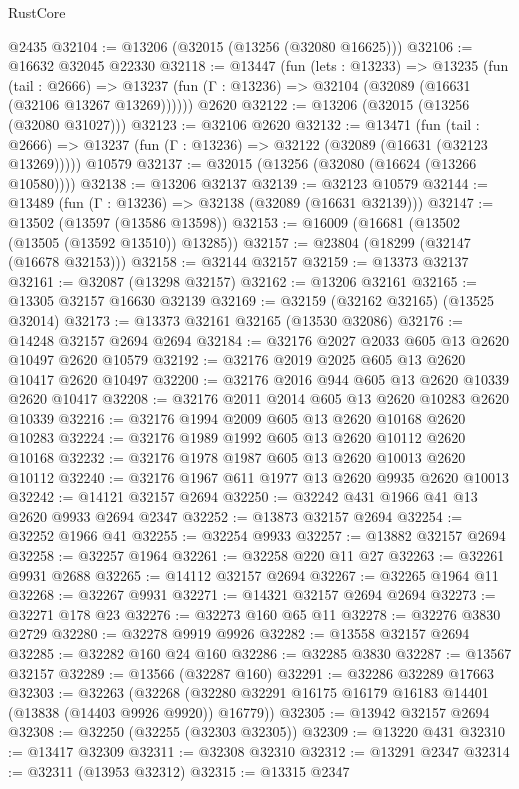 \begin{lexlean}{RustCore}
\begin{coremodule}
    @2435
@32104 := @13206 (@32015 (@13256 (@32080 @16625)))
@32106 := @16632 @32045 @22330
@32118 := @13447
    (fun (lets : @13233) =>
    @13235
      (fun (tail : @2666) =>
      @13237 (fun (Γ : @13236) => @32104 (@32089 (@16631 (@32106 @13267 @13269))))))
    @2620
@32122 := @13206 (@32015 (@13256 (@32080 @31027)))
@32123 := @32106 @2620
@32132 := @13471
    (fun (tail : @2666) => @13237 (fun (Γ : @13236) => @32122 (@32089 (@16631 (@32123 @13269)))))
    @10579
@32137 := @32015 (@13256 (@32080 (@16624 (@13266 @10580))))
@32138 := @13206 @32137
@32139 := @32123 @10579
@32144 := @13489 (fun (Γ : @13236) => @32138 (@32089 (@16631 @32139)))
@32147 := @13502 (@13597 (@13586 @13598))
@32153 := @16009 (@16681 (@13502 (@13505 (@13592 @13510)) @13285))
@32157 := @23804 (@18299 (@32147 (@16678 @32153)))
@32158 := @32144 @32157
@32159 := @13373 @32137
@32161 := @32087 (@13298 @32157)
@32162 := @13206 @32161
@32165 := @13305 @32157 @16630 @32139
@32169 := @32159 (@32162 @32165) (@13525 @32014)
@32173 := @13373 @32161 @32165 (@13530 @32086)
@32176 := @14248 @32157 @2694 @2694
@32184 := @32176 @2027 @2033 @605 @13 @2620 @10497 @2620 @10579
@32192 := @32176 @2019 @2025 @605 @13 @2620 @10417 @2620 @10497
@32200 := @32176 @2016 @944 @605 @13 @2620 @10339 @2620 @10417
@32208 := @32176 @2011 @2014 @605 @13 @2620 @10283 @2620 @10339
@32216 := @32176 @1994 @2009 @605 @13 @2620 @10168 @2620 @10283
@32224 := @32176 @1989 @1992 @605 @13 @2620 @10112 @2620 @10168
@32232 := @32176 @1978 @1987 @605 @13 @2620 @10013 @2620 @10112
@32240 := @32176 @1967 @611 @1977 @13 @2620 @9935 @2620 @10013
@32242 := @14121 @32157 @2694
@32250 := @32242 @431 @1966 @41 @13 @2620 @9933 @2694 @2347
@32252 := @13873 @32157 @2694
@32254 := @32252 @1966 @41
@32255 := @32254 @9933
@32257 := @13882 @32157 @2694
@32258 := @32257 @1964
@32261 := @32258 @220 @11 @27
@32263 := @32261 @9931 @2688
@32265 := @14112 @32157 @2694
@32267 := @32265 @1964 @11
@32268 := @32267 @9931
@32271 := @14321 @32157 @2694 @2694
@32273 := @32271 @178 @23
@32276 := @32273 @160 @65 @11
@32278 := @32276 @3830 @2729
@32280 := @32278 @9919 @9926
@32282 := @13558 @32157 @2694
@32285 := @32282 @160 @24 @160
@32286 := @32285 @3830
@32287 := @13567 @32157
@32289 := @13566 (@32287 @160)
@32291 := @32286 @32289 @17663
@32303 := @32263
    (@32268 (@32280 @32291 @16175 @16179 @16183 @14401 (@13838 (@14403 @9926 @9920)) @16779))
@32305 := @13942 @32157 @2694
@32308 := @32250 (@32255 (@32303 @32305))
@32309 := @13220 @431
@32310 := @13417 @32309
@32311 := @32308 @32310
@32312 := @13291 @2347
@32314 := @32311 (@13953 @32312)
@32315 := @13315 @2347

\end{coremodule}
\end{lexlean}
